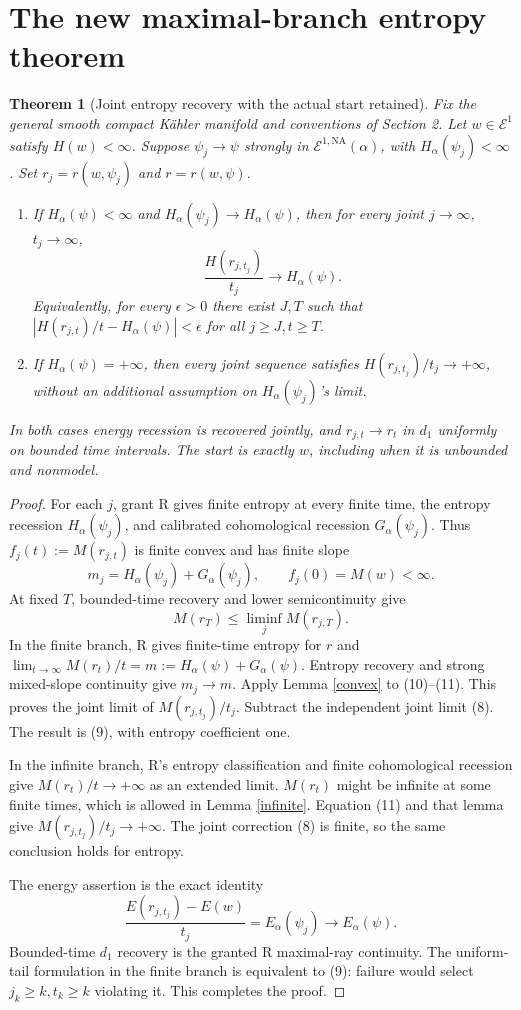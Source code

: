 \documentclass[11pt]{article}
\newtheorem{theorem}{Theorem}
\newcommand{\NA}{\mathrm{NA}}
\begin{document}
\section{The new maximal-branch entropy theorem}
\begin{theorem}[Joint entropy recovery with the actual start retained]
\label{entropy}
Fix the general smooth compact K\"ahler manifold and conventions
of Section 2. Let $w\in\mathcal E^1$ satisfy $H(w)<\infty$.
Suppose $\psi_j\to\psi$ strongly in
$\mathcal E^{1,\NA}(\alpha)$, with $H_\alpha(\psi_j)<\infty$.
Set $r_j=r(w,\psi_j)$ and $r=r(w,\psi)$.
\begin{enumerate}
\item If $H_\alpha(\psi)<\infty$ and
$H_\alpha(\psi_j)\to H_\alpha(\psi)$, then for every joint
$j\to\infty$, $t_j\to\infty$,
\[
 \frac{H(r_{j,t_j})}{t_j}\longrightarrow H_\alpha(\psi).
 \tag{9}
\]
Equivalently, for every $\epsilon>0$ there exist $J,T$ such that
$|H(r_{j,t})/t-H_\alpha(\psi)|<\epsilon$ for all $j\ge J,t\ge T$.
\item If $H_\alpha(\psi)=+\infty$, then every joint sequence
satisfies $H(r_{j,t_j})/t_j\to+\infty$, without an additional
assumption on $H_\alpha(\psi_j)$'s limit.
\end{enumerate}
In both cases energy recession is recovered jointly, and
$r_{j,t}\to r_t$ in $d_1$ uniformly on bounded time intervals.
The start is exactly $w$, including when it is unbounded and nonmodel.
\end{theorem}
\begin{proof}
For each $j$, grant R gives finite entropy at every finite time,
the entropy recession $H_\alpha(\psi_j)$, and calibrated
cohomological recession $G_\alpha(\psi_j)$.
Thus $f_j(t):=M(r_{j,t})$ is finite convex and has finite slope
\[
 m_j=H_\alpha(\psi_j)+G_\alpha(\psi_j),\qquad f_j(0)=M(w)<\infty.
 \tag{10}
\]
At fixed $T$, bounded-time recovery and lower semicontinuity give
\[
 M(r_T)\le\liminf_j M(r_{j,T}).                         \tag{11}
\]
In the finite branch, R gives finite-time entropy for $r$ and
$\lim_{t\to\infty}M(r_t)/t
=m:=H_\alpha(\psi)+G_\alpha(\psi)$.
Entropy recovery and strong mixed-slope continuity give $m_j\to m$.
Apply Lemma \ref{convex} to (10)--(11). This proves the joint limit
of $M(r_{j,t_j})/t_j$. Subtract the independent joint limit (8).
The result is (9), with entropy coefficient one.

In the infinite branch, R's entropy classification and finite
cohomological recession give $M(r_t)/t\to+\infty$ as an extended
limit. $M(r_t)$ might be infinite at some finite times, which is
allowed in Lemma \ref{infinite}. Equation (11) and that lemma
give $M(r_{j,t_j})/t_j\to+\infty$. The joint correction (8) is
finite, so the same conclusion holds for entropy.

The energy assertion is the exact identity
\[
 \frac{E(r_{j,t_j})-E(w)}{t_j}=E_\alpha(\psi_j)\to E_\alpha(\psi).
 \tag{12}
\]
Bounded-time $d_1$ recovery is the granted R maximal-ray continuity.
The uniform-tail formulation in the finite branch is equivalent
to (9): failure would select $j_k\ge k,t_k\ge k$ violating it.
This completes the proof.
\end{proof}
\end{document}
